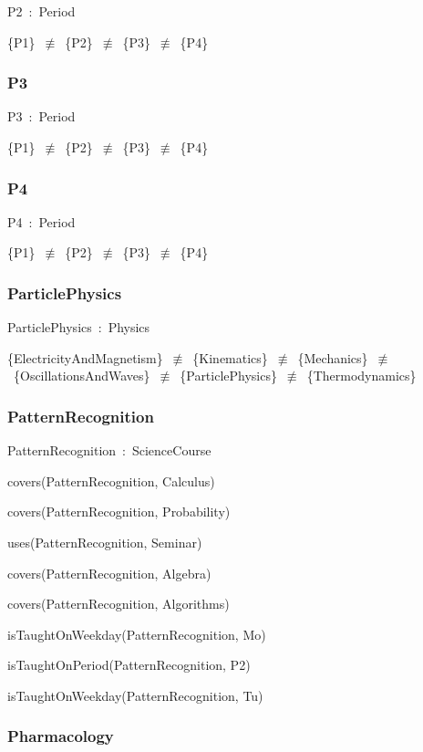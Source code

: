 \documentclass{article}
\begin{document}
P2~:~Period

\{P1\}~\ensuremath{\not\equiv}~\{P2\}~\ensuremath{\not\equiv}~\{P3\}~\ensuremath{\not\equiv}~\{P4\}

\subsubsection*{P3}

P3~:~Period

\{P1\}~\ensuremath{\not\equiv}~\{P2\}~\ensuremath{\not\equiv}~\{P3\}~\ensuremath{\not\equiv}~\{P4\}

\subsubsection*{P4}

P4~:~Period

\{P1\}~\ensuremath{\not\equiv}~\{P2\}~\ensuremath{\not\equiv}~\{P3\}~\ensuremath{\not\equiv}~\{P4\}

\subsubsection*{ParticlePhysics}

ParticlePhysics~:~Physics

\{ElectricityAndMagnetism\}~\ensuremath{\not\equiv}~\{Kinematics\}~\ensuremath{\not\equiv}~\{Mechanics\}~\ensuremath{\not\equiv}~\{OscillationsAndWaves\}~\ensuremath{\not\equiv}~\{ParticlePhysics\}~\ensuremath{\not\equiv}~\{Thermodynamics\}

\subsubsection*{PatternRecognition}

PatternRecognition~:~ScienceCourse

covers(PatternRecognition, Calculus)

covers(PatternRecognition, Probability)

uses(PatternRecognition, Seminar)

covers(PatternRecognition, Algebra)

covers(PatternRecognition, Algorithms)

isTaughtOnWeekday(PatternRecognition, Mo)

isTaughtOnPeriod(PatternRecognition, P2)

isTaughtOnWeekday(PatternRecognition, Tu)

\subsubsection*{Pharmacology}
\end{document}
